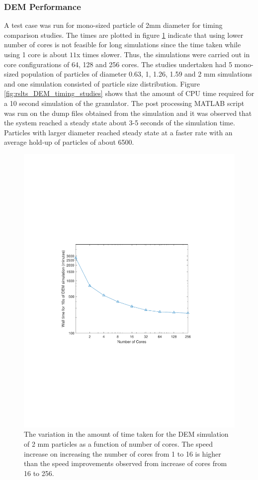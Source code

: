 \documentclass[preprint,11pt,authoryear]{elsarticle}
\begin{document}
\subsubsection{DEM Performance}
A test case was run for mono-sized particle of 2mm diameter for timing comparison studies. The 
times are plotted in figure \ref{fig:rslts_DEM_2mm_timing} indicate that using lower number of cores is 
not feasible for long simulations since the time taken while using 1 core is about $11$x times slower.
Thus, the simulations were carried out in core configurations of 64, 128 and 256 cores. The studies 
undertaken had 5 mono-sized population of particles of diameter 0.63, 1, 1.26, 1.59 and 2 mm 
simulations and one simulation consisted of particle size distribution. Figure 
\ref{fig:rslts_DEM_timing_studies} shows that the amount of CPU time required for a 10 second 
simulation of the granulator. The post processing MATLAB script was run on the dump files obtained 
from the simulation and it was observed that the system reached a steady state about 3-5 seconds of 
the simulation time. Particles with larger diameter reached steady state at a faster rate with an average 
hold-up of particles of about 6500. 
\begin{figure}
\centering
\includegraphics[scale=0.75]{rslsts_2mm_timing_mtlb.pdf}
\caption{The variation in the amount of time taken for the DEM simulation of 2 mm particles as a function of number of cores. The 
speed increase on increasing the number of cores from 1 to 16 is higher than the speed improvements observed from increase of cores 
from 16 to 256.}
\label{fig:rslts_DEM_2mm_timing}
\end{figure}	
\end{document}
